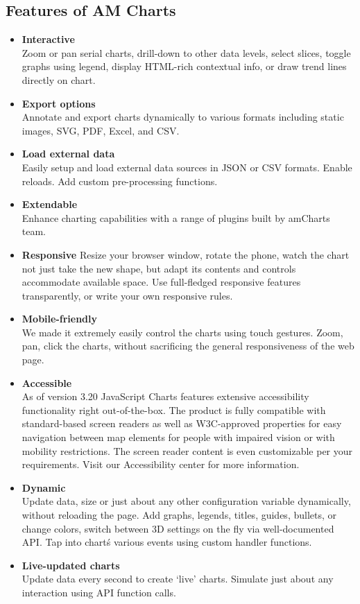 \subsection*{Features of AM Charts}
\begin{itemize}
	\item \textbf{Interactive}\\
Zoom or pan serial charts, drill-down to other data levels, select slices, toggle graphs using legend, display HTML-rich contextual info, or draw trend lines directly on chart.
	\item \textbf{Export options}\\
Annotate and export charts dynamically to various formats including static images, SVG, PDF, Excel, and CSV.
	\item \textbf{Load external data}\\
Easily setup and load external data sources in JSON or CSV formats. Enable reloads. Add custom pre-processing functions.
	\item \textbf{Extendable}\\
Enhance charting capabilities with a range of plugins built by amCharts team.
	\item \textbf{Responsive}
Resize your browser window, rotate the phone, watch the chart not just take the new shape, but adapt its contents and controls accommodate available space. Use full-fledged responsive features transparently, or write your own responsive rules.
	\item \textbf{Mobile-friendly}\\
We made it extremely easily control the charts using touch gestures. Zoom, pan, click the charts, without sacrificing the general responsiveness of the web page.
	\item \textbf{Accessible}\\
As of version 3.20 JavaScript Charts features extensive accessibility functionality right out-of-the-box. The product is fully compatible with standard-based screen readers as well as W3C-approved properties for easy navigation between map elements for people with impaired vision or with mobility restrictions. The screen reader content is even customizable per your requirements. Visit our Accessibility center for more information.
	\item \textbf{Dynamic}\\
Update data, size or just about any other configuration variable dynamically, without reloading the page. Add graphs, legends, titles, guides, bullets, or change colors, switch between 3D settings on the fly via well-documented API. Tap into chart\'s various events using custom handler functions.
	\item \textbf{Live-updated charts}\\
Update data every second to create `live' charts. Simulate just about any interaction using API function calls.
\end{itemize}

